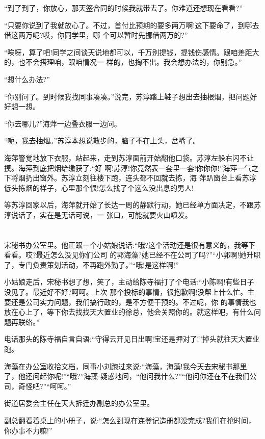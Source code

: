\documentclass[11pt,a4paper,onecolumn]{article}
\begin{document}
``到了到了，你放心，那天签合同的时候我就带去了。你难道还想现在看看?''

``只要你说到了我就放心了。不过，首付比预期的要多两万啊!这下要命了，到哪去借这两万呢?哎，你同学里，哪
个可以暂时先挪借两万的?''

``唉呀，算了吧!同学之间谈天说地都可以，千万别提钱，提钱伤感情。跟咱差距大的，也不会搭理咱，跟咱情况一
样的，也掏不出。我会想办法的，你别急。''

``想什么办法?''

``你别问了。到时候我找同事凑凑。''说完，苏淳踏上鞋子想出去抽根烟，把问题好好想一想。

``你去哪儿?''海萍一边叠衣服一边问。

``呃，我去抽烟。''苏淳本想说散步的，脑子不在上头，岔嘴了。

海萍警觉地放下衣服，站起来，走到苏淳面前开始翻他口袋。苏淳左躲右闪不让摸。海萍到底把烟给缴获了:``好
啊!苏淳!你竟然表一套里一套!你你你!''海萍一气之下将烟扔出窗外。苏淳立刻往楼下跑，连头都不回就去拣，海
萍趴窗台上看苏淳低头拣烟的样子，心里那个恨!怎么找了个这么没出息的男人!

等苏淳回家以后，海萍就开始了长达一周的静默行动，她已经单方面决定，不跟苏淳说话了，实在是无话可说，一
张口，可能就要火山喷发。

\section[\thesection]{}

宋秘书办公室里。他正跟一个小姑娘说话:``哦?这个活动还是很有意义的，我等下看看。哎?最近怎么没见你们公司
的郭海藻?她已经不在公司了吗?''``小郭啊!她升职了，专门负责策划活动，不再跑外勤了。''``哦!是这样啊!''

小姑娘走后，宋秘书想了想，笑了，主动给陈寺福打了个电话:``小陈啊!有些日子没见了。最近好不好?呵呵。上次
那个投标的事情，很抱歉啊!没帮上什么忙。主要还是公司实力问题，我们搞行政的，是不方便干预的。不过呢，你
的事情我也放在心上了，等下你去找找天大置业的徐总，他会关照你的。就这样吧，有什么问题再联络。''

电话那头的陈寺福自言自语:``守得云开见日出啊!宝还是押对了!''掉头就往天大置业跑。

海藻在办公室收拾文档，同事小刘跑过来说:``海藻，海藻!我今天去宋秘书那里了，他还问起你呢!''``哦?''海藻
疑惑地问，``他问我什么?''``他问你还在不在我们公司，奇怪吧?''``呵呵。''

街道居委会主任在天大拆迁办副总的办公室里。

副总翻看着桌上的小册子，说:``怎么到现在连登记造册都没完成?我们在抢时间，你办事不力嘛!''
\end{document}
